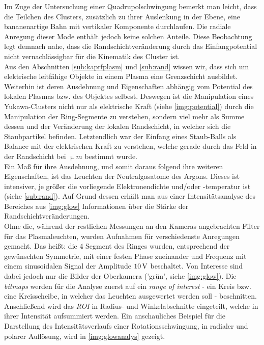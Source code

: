 \documentclass[numbers=noenddot,a4paper]{scrartcl}
\newcommand{\tilt}[1]{\textit{#1}}
\begin{document}
		Im Zuge der Untersuchung einer Quadrupolschwingung bemerkt man leicht, dass die Teilchen des Clusters, zusätzlich zu ihrer Auslenkung in der Ebene, eine bananenartige Bahn mit vertikaler Komponente durchlaufen. Die radiale Anregung dieser Mode enthält jedoch keine solchen Anteile. Diese Beobachtung legt demnach nahe, dass die Randschichtveränderung durch das Einfangpotential nicht vernachlässigbar für die Kinematik des Cluster ist.\\
		Aus den Abschnitten \ref{sub:kaprfplasm} und \ref{sub:rand} wissen wir,  dass sich um elektrische leitfähige Objekte in einem Plasma eine Grenzschicht ausbildet. Weiterhin ist deren Ausdehnung und Eigenschaften abhängig vom Potential des lokalen Plasmas bzw. des Objektes selbest. Deswegen ist die Manipulation eines Yukawa-Clusters nicht nur als elektrische Kraft (siehe \ref{img:potential}) durch die Manipulation der Ring-Segmente zu verstehen, sondern viel mehr als Summe dessen und der Veränderung der lokalen Randschicht, in welcher sich die Staubpartikel befinden. Letztendlich war der Einfang eines Staub-Balls als Balance mit der elektrischen Kraft zu verstehen, welche gerade durch das Feld in der Randschicht bei $\unit{\upmu m}$ bestimmt wurde.\\
		Ein Maß für ihre Ausdehnung, und somit daraus folgend ihre weiteren Eigenschaften, ist das Leuchten der Neutralgasatome des Argons. Dieses ist intensiver, je größer die vorliegende Elektronendichte und/oder -temperatur ist (siehe \ref{sub:rand}).  Auf Grund dessen erhält man aus einer Intensitätsanalyse des Bereiches aus \ref{img:glow} Informationen über die Stärke der Randschichtveränderungen.\\
        Ohne die, während der restlichen Messungen an den Kameras angebrachten Filter für das Plasmaleuchten, wurden Aufnahmen für verschiedenste Anregungen gemacht. Das heißt: die 4 Segment des Ringes wurden, entsprechend der gewünschten Symmetrie, mit einer festen Phase zueinander und Frequenz mit einem sinusoidalen Signal der Amplitude $\unit[10]{V}$ beschaltet. Von Interesse sind dabei jedoch nur die Bilder der Oberkamera ('grün', siehe \ref{img:glow}). Die \tilt{bitmaps} werden für die Analyse zuerst auf ein \tilt{range of interest} - ein Kreis bzw. eine Kreisscheibe, in welcher das Leuchten ausgewertet werden soll - beschnitten. Anschließend wird das \tilt{ROI} in Radius- und Winkelabschnitte eingeteilt, welche in ihrer Intensität aufsummiert werden. Ein anschauliches Beispiel für die Darstellung des Intensitätsverlaufs einer Rotationsschwingung, in radialer und polarer Auflösung, wird in \ref{img:glowanalys} gezeigt.
\end{document}
